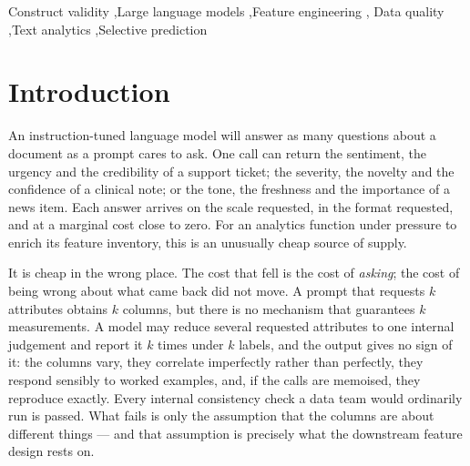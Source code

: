 \documentclass[preprint,12pt,authoryear]{elsarticle}
\theoremstyle{plain}
\theoremstyle{remark}
\begin{document}
\begin{frontmatter}
\begin{keyword}
Construct validity \sep Large language models \sep Feature engineering \sep
Data quality \sep Text analytics \sep Selective prediction
\end{keyword}

\end{frontmatter}

\renewcommand{\footnotetext}[1]{\par\vspace{0.4em}{\footnotesize #1\par}}

\section{Introduction}\label{sec:intro}

An instruction-tuned language model will answer as many questions about a
document as a prompt cares to ask. One call can return the sentiment, the
urgency and the credibility of a support ticket; the severity, the novelty and
the confidence of a clinical note; or the tone, the freshness and the importance
of a news item. Each answer arrives on the scale requested, in the format
requested, and at a marginal cost close to zero. For an analytics function under
pressure to enrich its feature inventory, this is an unusually cheap source of
supply.

It is cheap in the wrong place. The cost that fell is the cost of \emph{asking};
the cost of being wrong about what came back did not move. A prompt that
requests $k$ attributes obtains $k$ columns, but there is no mechanism that
guarantees $k$ measurements. A model may reduce several requested attributes to
one internal judgement and report it $k$ times under $k$ labels, and the output
gives no sign of it: the columns vary, they correlate imperfectly rather than
perfectly, they respond sensibly to worked examples, and, if the calls are
memoised, they reproduce exactly. Every internal consistency check a data team
would ordinarily run is passed. What fails is only the assumption that the
columns are about different things --- and that assumption is precisely what the
downstream feature design rests on.
\end{document}
